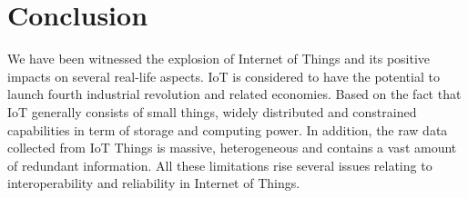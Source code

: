 \section{Conclusion}
We have been witnessed the explosion of Internet of Things and its positive impacts on several real-life aspects. IoT is considered to have the potential to launch fourth industrial revolution and related economies. Based on the fact that IoT generally consists of small things, widely distributed and constrained capabilities in term of storage and computing power. In addition, the raw data collected from IoT Things is massive, heterogeneous and contains a vast amount of redundant information. All these limitations rise several issues relating to interoperability and reliability in Internet of Things.\\

